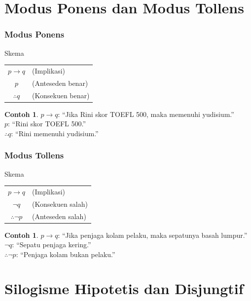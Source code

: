 \documentclass[handout]{beamer}
\theoremstyle{definition}
\theoremstyle{example}
\newtheorem{contoh}[theorem]{Contoh}
\begin{document}
\section{Modus Ponens dan Modus Tollens}

\begin{frame}
\frametitle{Modus Ponens}
\begin{block}{Skema}
\begin{tabular}{cl}
$p \rightarrow q$ & (Implikasi) \\
$p$ & (Anteseden benar) \\
\hline
$\therefore q$ & (Konsekuen benar)
\end{tabular}
\end{block}
\begin{contoh}
$p \rightarrow q$: ``Jika Rini skor TOEFL 500, maka memenuhi yudisium.''\\
$p$: ``Rini skor TOEFL 500.''\\
$\therefore q$: ``Rini memenuhi yudisium.''
\end{contoh}
\end{frame}

\begin{frame}
\frametitle{Modus Tollens}
\begin{block}{Skema}
\begin{tabular}{cl}
$p \rightarrow q$ & (Implikasi) \\
$\neg q$ & (Konsekuen salah) \\
\hline
$\therefore \neg p$ & (Anteseden salah)
\end{tabular}
\end{block}
\begin{contoh}
$p \rightarrow q$: ``Jika penjaga kolam pelaku, maka sepatunya basah lumpur.''\\
$\neg q$: ``Sepatu penjaga kering.''\\
$\therefore \neg p$: ``Penjaga kolam bukan pelaku.''
\end{contoh}
\end{frame}

\section{Silogisme Hipotetis dan Disjungtif}
\end{document}
